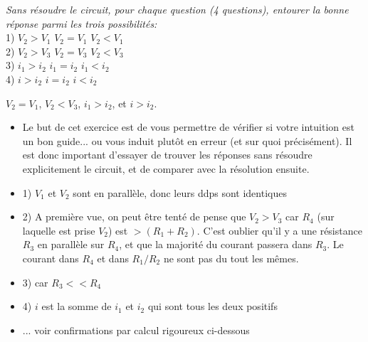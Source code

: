 \Question
{
\textit{Sans résoudre le circuit, pour chaque question (4 questions), entourer la bonne réponse parmi les trois possibilités:}\\
1) \hspace{1cm} $V_2 > V_1$ \hspace{1cm}  $V_2 = V_1$ \hspace{1cm} $V_2 < V_1$\\
2) \hspace{1cm} $V_2 > V_3$ \hspace{1cm}  $V_2 = V_3$ \hspace{1cm} $V_2 < V_3$\\
3) \hspace{1cm}  $i_1 > i_2$ \hspace{1.25cm}  $i_1 = i_2$ \hspace{1.25cm} $i_1 < i_2$\\
4) \hspace{1cm} $i > i_2$ \hspace{1.4cm}  $i = i_2$ \hspace{1.4cm} $i < i_2$\\
}
{%
\textbf{$V_2 = V_1$},
\textbf{$V_2 < V_3$},
\textbf{$i_1 > i_2$}, et 
\textbf{$i > i_2$}.
\begin{itemize}
\item Le but de cet exercice est de vous permettre de vérifier si votre intuition est un bon guide... ou vous induit plutôt en erreur (et sur quoi précisément). Il est donc important d'essayer de trouver les réponses sans résoudre explicitement le circuit, et de comparer avec la résolution ensuite.
\item 1) $V_1$ et $V_2$ sont en parallèle, donc leurs ddps sont identiques
\item 2) A première vue, on peut être tenté de pense que $V_2>V_3$ car $R_4$ (sur laquelle est prise $V_2$) est $>(R_1+R_2)$. C'est oublier qu'il y a une résistance $R_3$ en parallèle sur $R_4$, et que la majorité du courant passera dans $R_3$. Le courant dans $R_4$ et dans $R_1/R_2$ ne sont pas du tout les mêmes.
\item 3) car $R_3<<R_4$
\item 4) $i$ est la somme de $i_1$ et $i_2$ qui sont tous les deux positifs
\item ... voir confirmations par calcul rigoureux ci-dessous
\end{itemize}
}

